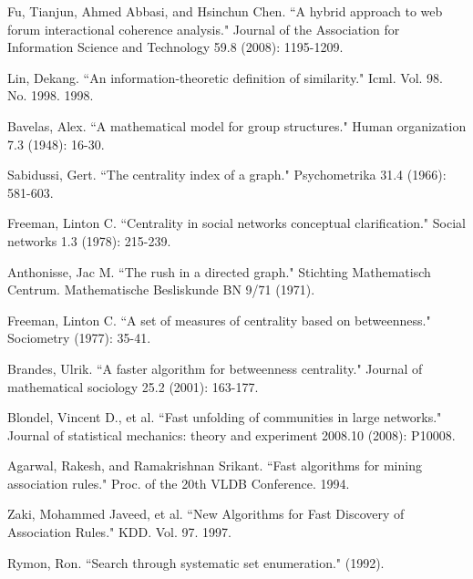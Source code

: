 \begin{thebibliography}{9}

 Fu, Tianjun, Ahmed Abbasi, and Hsinchun Chen. ``A hybrid approach to web forum interactional coherence analysis." Journal of the Association for Information Science and Technology 59.8 (2008): 1195-1209.

 Lin, Dekang. ``An information-theoretic definition of similarity." Icml. Vol. 98. No. 1998. 1998.

 Bavelas, Alex. ``A mathematical model for group structures." Human organization 7.3 (1948): 16-30.

 Sabidussi, Gert. ``The centrality index of a graph." Psychometrika 31.4 (1966): 581-603.

 Freeman, Linton C. ``Centrality in social networks conceptual clarification." Social networks 1.3 (1978): 215-239.

 Anthonisse, Jac M. ``The rush in a directed graph." Stichting Mathematisch Centrum. Mathematische Besliskunde BN 9/71 (1971).

 Freeman, Linton C. ``A set of measures of centrality based on betweenness." Sociometry (1977): 35-41.

 Brandes, Ulrik. ``A faster algorithm for betweenness centrality." Journal of mathematical sociology 25.2 (2001): 163-177. 

 Blondel, Vincent D., et al. ``Fast unfolding of communities in large networks." Journal of statistical mechanics: theory and experiment 2008.10 (2008): P10008.

 Agarwal, Rakesh, and Ramakrishnan Srikant. ``Fast algorithms for mining association rules." Proc. of the 20th VLDB Conference. 1994.

 Zaki, Mohammed Javeed, et al. ``New Algorithms for Fast Discovery of Association Rules." KDD. Vol. 97. 1997.

 Rymon, Ron. ``Search through systematic set enumeration." (1992).

\end{thebibliography}

